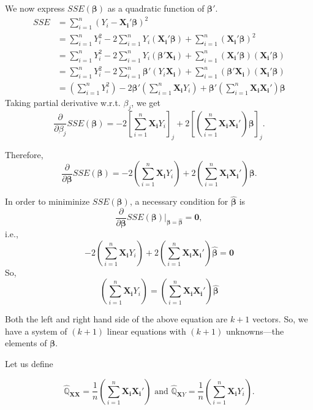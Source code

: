 \documentclass[
]{book}
\theoremstyle{definition}
\theoremstyle{definition}
\theoremstyle{definition}
\theoremstyle{definition}
\theoremstyle{remark}
\begin{document}
We now express \(SSE(\pmb{\beta})\) as a quadratic function of \(\pmb{\beta}'\).
\begin{align}
SSE &=\sum\limits_{i=1}^n(Y_i-\pmb{X_i}'\pmb{\beta})^2 \\
&=\sum\limits_{i=1}^n Y_i^2 
  - 2\sum\limits_{i=1}^n Y_i(\pmb{X_i}'\pmb{\beta})
  + \sum\limits_{i=1}^n (\pmb{X_i}'\pmb{\beta})^2 \\
&=\sum\limits_{i=1}^n Y_i^2 
  - 2\sum\limits_{i=1}^n Y_i(\pmb{\beta}'\pmb{X_i})
  + \sum\limits_{i=1}^n (\pmb{X_i}'\pmb{\beta})(\pmb{X_i}'\pmb{\beta}) \\
&=\sum\limits_{i=1}^n Y_i^2 
  - 2\sum\limits_{i=1}^n \pmb{\beta}'(Y_i\pmb{X_i})
  + \sum\limits_{i=1}^n (\pmb{\beta}'\pmb{X_i})(\pmb{X_i}'\pmb{\beta}) \\
&=\left(\sum\limits_{i=1}^n Y_i^2\right) 
  - 2\pmb{\beta}'\left(\sum\limits_{i=1}^n\pmb{X_i}Y_i\right)
  + \pmb{\beta}'\left(\sum\limits_{i=1}^n \pmb{X_i}\pmb{X_i}'\right)\pmb{\beta}
\end{align}
Taking partial derivative w.r.t. \(\beta_j\), we get
\[
\frac{\partial}{\partial\beta_j}SSE(\pmb{\beta})=-2\left[\sum\limits_{i=1}^n\pmb{X_i}Y_i\right]_j 
+ 2\left[\left(\sum\limits_{i=1}^n  \pmb{X_i}\pmb{X_i}'\right)\pmb{\beta}\right]_j.
\]

Therefore,
\[
\frac{\partial}{\partial\pmb{\beta}}SSE(\pmb{\beta})
=-2\left(\sum\limits_{i=1}^n\pmb{X_i}Y_i\right) 
+ 2\left(\sum\limits_{i=1}^n  \pmb{X_i}\pmb{X_i}'\right)\pmb{\beta}.
\]

In order to miniminize \(SSE(\pmb{\beta})\), a necessary condition for \(\widehat{\pmb{\beta}}\) is
\[
\frac{\partial}{\partial\pmb{\beta}}SSE(\pmb{\beta})\bigg|_{\pmb{\beta}
=\widehat{\pmb{\beta}}}=\pmb{0},
\]
i.e.,
\[
-2\left(\sum\limits_{i=1}^n\pmb{X_i}Y_i\right) 
+ 2\left(\sum\limits_{i=1}^n  \pmb{X_i}\pmb{X_i}'\right)\widehat{\pmb{\beta}}
=\pmb{0}
\]
So,
\begin{equation}
\left(\sum\limits_{i=1}^n\pmb{X_i}Y_i\right)
=\left(\sum\limits_{i=1}^n  \pmb{X_i}\pmb{X_i}'\right)\widehat{\pmb{\beta}}
\label{eq:moment-0}
\end{equation}

Both the left and right hand side of the above equation are \(k+1\) vectors. So, we have a system of \((k+1)\) linear equations with \((k+1)\) unknowns---the elements of \(\pmb{\beta}\).

Let us define

\[
\widehat{\mathbb{Q}}_{\pmb{XX}}
=\frac{1}{n}\left(\sum\limits_{i=1}^n\pmb{X_i}\pmb{X_i}'\right)
\mbox{ and }
\widehat{\mathbb{Q}}_{\pmb{X}Y}
=\frac{1}{n}\left(\sum\limits_{i=1}^n\pmb{X_i}Y_i\right).
\]
\end{document}
